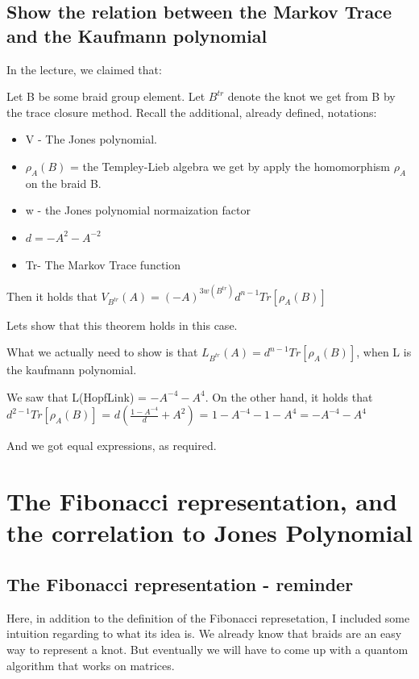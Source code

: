 \documentclass{article}
\begin{document}
\subsection{Show the relation between the Markov Trace and the Kaufmann polynomial}

In the lecture, we claimed that:
\begin{theorem}
Let B be some braid group element. Let $B^{tr}$ denote the knot we get from B by the trace closure method. Recall the additional, already defined, notations:
\begin{itemize}
\item V - The Jones polynomial.
\item $\rho_{A}(B)$ = the Templey-Lieb algebra we get by apply the homomorphism $\rho_{A}$ on the braid B.
\item w - the Jones polynomial normaization factor
\item $d = -A^{2}-A^{-2}$
\item Tr- The Markov Trace function
\end{itemize}

Then it holds that
$V_{B^{tr}}(A) = (-A)^{3w(B^{tr})}d^{n-1}Tr[\rho_{A}(B)]$

Lets show that this theorem holds in this case.

What we actually need to show is that $L_{B^{tr}}(A) = d^{n-1}Tr[\rho_{A}(B)]$, when L is the kaufmann polynomial.

We saw that L(HopfLink) = $-A^{-4}-A^{4}$.
On the other hand, it holds that $d^{2 - 1}Tr[\rho_{A}(B)]$ = $d( \frac{1 - A^{-4}}{d} + A^{2})$ = $1 - A^{-4} -1 -A^{4} = -A^{-4}-A^{4}$

And we got equal expressions, as required.

\section{The Fibonacci representation, and the correlation to Jones Polynomial} 

\subsection{The Fibonacci representation - reminder}
Here, in addition to the definition of the Fibonacci represetation, I included some intuition regarding to what its idea is. 
We already know that braids are an easy way to represent a knot. But eventually we will have to come up with a quantom algorithm that works on matrices.


\end{theorem}
\end{document}
